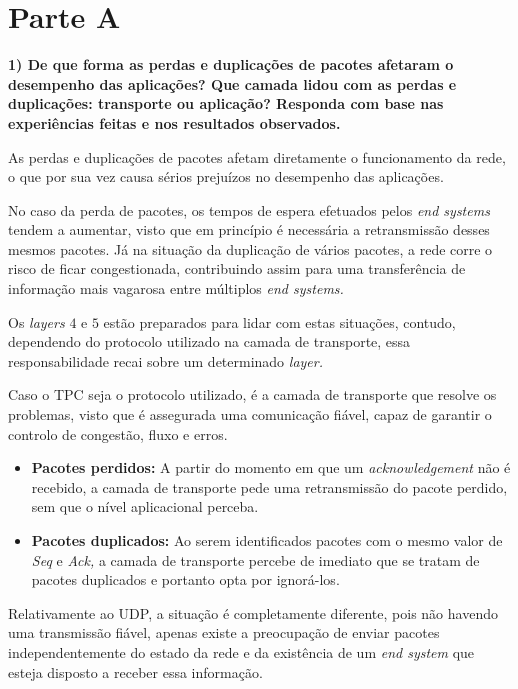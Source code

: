 \section{Parte A}

        \textbf{1) De que forma as perdas e duplicações de pacotes afetaram o desempenho das aplicações? Que camada lidou com as perdas e duplicações: transporte ou aplicação? Responda com base nas experiências feitas e nos resultados observados.}

        As perdas e duplicações de pacotes afetam diretamente o funcionamento da rede, o que por sua vez causa sérios prejuízos no desempenho das aplicações.
        
        No caso da perda de pacotes, os tempos de espera efetuados pelos \textit{end systems} tendem a aumentar, visto que em princípio é necessária a retransmissão desses mesmos pacotes. Já na situação da duplicação de vários pacotes, a rede corre o risco de ficar congestionada, contribuindo assim para uma transferência de informação mais vagarosa entre múltiplos \textit{end systems.}

        Os \textit{layers} $4$ e $5$ estão preparados para lidar com estas situações, contudo, dependendo do protocolo utilizado na camada de transporte, essa responsabilidade recai sobre um determinado \textit{layer.}

        Caso o TPC seja o protocolo utilizado, é a camada de transporte que resolve os problemas, visto que é assegurada uma comunicação fiável, capaz de garantir o controlo de congestão, fluxo e erros.

        \begin{itemize}
            \item \textbf{Pacotes perdidos:} A partir do momento em que um \textit{acknowledgement} não é recebido, a camada de transporte pede uma retransmissão do pacote perdido, sem que o nível aplicacional perceba.
            \item \textbf{Pacotes duplicados:} Ao serem identificados pacotes com o mesmo valor de \textit{Seq} e \textit{Ack,} a camada de transporte percebe de imediato que se tratam de pacotes duplicados e portanto opta por ignorá-los.
        \end{itemize}

        Relativamente ao UDP, a situação é completamente diferente, pois não havendo uma transmissão fiável, apenas existe a preocupação de enviar pacotes independentemente do estado da rede e da existência de um \textit{end system} que esteja disposto a receber essa informação.

